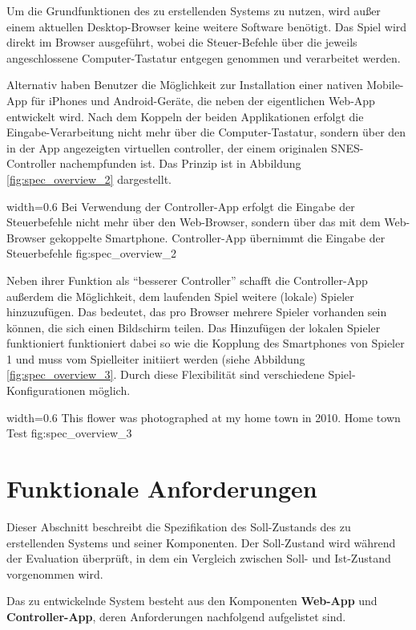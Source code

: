 Um die Grundfunktionen des zu erstellenden Systems zu nutzen, wird außer
einem aktuellen Desktop-Browser keine weitere Software benötigt. Das
Spiel wird direkt im Browser ausgeführt, wobei die Steuer-Befehle über
die jeweils angeschlossene Computer-Tastatur entgegen genommen und
verarbeitet werden.

Alternativ haben Benutzer die Möglichkeit zur Installation einer nativen
Mobile-App für iPhones und Android-Geräte, die neben der eigentlichen
Web-App entwickelt wird. Nach dem Koppeln der beiden Applikationen
erfolgt die Eingabe-Verarbeitung nicht mehr über die Computer-Tastatur,
sondern über den in der App angezeigten virtuellen \gls{controller}, der
einem originalen SNES-Controller nachempfunden ist. Das Prinzip ist in
Abbildung \ref{fig:spec_overview_2} dargestellt.

   {width=0.6\textwidth}
   {Bei Verwendung der Controller-App erfolgt die Eingabe der Steuerbefehle nicht mehr über den Web-Browser, sondern über das mit dem Web-Browser gekoppelte Smartphone.}
   {Controller-App übernimmt die Eingabe der Steuerbefehle}
   {fig:spec_overview_2}

Neben ihrer Funktion als ``besserer Controller'' schafft die
Controller-App außerdem die Möglichkeit, dem laufenden Spiel weitere
(lokale) Spieler hinzuzufügen. Das bedeutet, das pro Browser mehrere
Spieler vorhanden sein können, die sich einen Bildschirm teilen. Das
Hinzufügen der lokalen Spieler funktioniert funktioniert dabei so wie
die Kopplung des Smartphones von Spieler 1 und muss vom Spielleiter
initiiert werden (siehe Abbildung \ref{fig:spec_overview_3}. Durch diese
Flexibilität sind verschiedene Spiel-Konfigurationen möglich.

   {width=0.6\textwidth}
   {This flower was photographed at my home town in 2010.}
   {Home town Test}
   {fig:spec_overview_3}

\section{Funktionale Anforderungen}\label{funktionale-anforderungen}

Dieser Abschnitt beschreibt die Spezifikation des Soll-Zustands des zu
erstellenden Systems und seiner Komponenten. Der Soll-Zustand wird
während der Evaluation überprüft, in dem ein Vergleich zwischen Soll-
und Ist-Zustand vorgenommen wird.

Das zu entwickelnde System besteht aus den Komponenten \textbf{Web-App}
und \textbf{Controller-App}, deren Anforderungen nachfolgend aufgelistet
sind.

